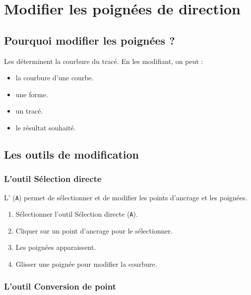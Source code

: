 \section{Modifier les poignées de direction}

\subsection{Pourquoi modifier les poignées ?}

Les  déterminent la courbure du tracé. En les modifiant, on peut :

\begin{itemize}
    \item {} la courbure d'une courbe.
    \item {} une forme.
    \item {} un tracé.
    \item {} le résultat souhaité.
\end{itemize}

\subsection{Les outils de modification}

\subsubsection{L'outil Sélection directe}

L' (\texttt{A}) permet de sélectionner et de modifier les points d'ancrage et les poignées.

\begin{enumerate}
    \item Sélectionner l'outil Sélection directe (\texttt{A}).
    \item Cliquer sur un point d'ancrage pour le sélectionner.
    \item Les poignées apparaissent.
    \item Glisser une poignée pour modifier la courbure.
\end{enumerate}

\subsubsection{L'outil Conversion de point}

